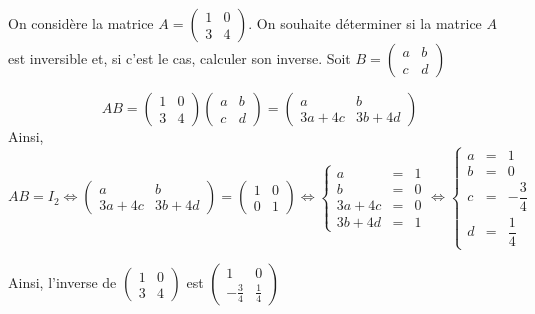 \documentclass[11pt,fleqn]{book} %
\begin{document}
\begin{example}On considère la matrice $A=\begin{pmatrix} 1 & 0 \\ 3 & 4\end{pmatrix}$. On souhaite déterminer si la matrice $A$ est inversible et, si c'est le cas, calculer son inverse. Soit $B=\begin{pmatrix}
a & b \\ c & d
\end{pmatrix}$

\[ AB = \begin{pmatrix} 1 & 0 \\ 3 & 4\end{pmatrix}\begin{pmatrix}
a & b \\ c & d\end{pmatrix} = \begin{pmatrix}
a & b \\ 3a+4c & 3b+4d 
\end{pmatrix}\]
Ainsi,
\[AB=I_2 \Leftrightarrow  \begin{pmatrix}
a & b \\ 3a+4c & 3b+4d 
\end{pmatrix} = \begin{pmatrix} 1 & 0 \\ 0 & 1\end{pmatrix} \Leftrightarrow \left\{\begin{array}{rcl}
a &=& 1 \\
b&=& 0 \\
3a+4c &=& 0 \\
 3b+4d &= &1
\end{array}\right. \Leftrightarrow \left\{\begin{array}{rcl}
a &=& 1 \\
b&=& 0 \\
c &=& -\dfrac{3}{4} \\
d &= & \dfrac{1}{4}
\end{array}\right. \]

Ainsi, l'inverse de $\begin{pmatrix} 1 & 0 \\ 3 & 4\end{pmatrix}$ est $\begin{pmatrix}
1 & 0 \\ -\frac{3}{4} & \frac{1}{4}
\end{pmatrix}$
\end{example}
\end{document}
